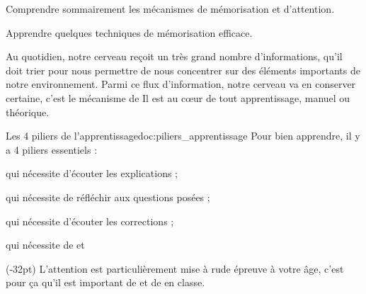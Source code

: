 \tetePremStssMeth

\vspace*{-32pt}

\begin{objectifs}
  \item Comprendre sommairement les mécanismes de mémorisation et d'attention.
  \item Apprendre quelques techniques de mémorisation efficace.
\end{objectifs}

\begin{contexte}
  Au quotidien, notre cerveau reçoit un très grand nombre d'informations, qu'il doit trier pour nous permettre de nous concentrer sur des éléments importants de notre environnement.
  Parmi ce flux d'information, notre cerveau va en conserver certaine, c'est le mécanisme de  Il est au cœur de tout apprentissage, manuel ou théorique.

\end{contexte}

\begin{doc}{Les 4 piliers de l'apprentissage}{doc:piliers_apprentissage}
  Pour bien apprendre, il y a 4 piliers essentiels : 
  \begin{listePoints}
    \item {} qui nécessite d'écouter les explications ;
    \item {} qui nécessite de réfléchir aux questions posées ;
    \item {} qui nécessite d'écouter les corrections ;
    \item {} qui nécessite de  et 
  \end{listePoints}

  (-32pt)
  L'attention est particulièrement mise à rude épreuve à votre âge, c'est pour ça qu'il est important de  et de  en classe.
\end{doc}

